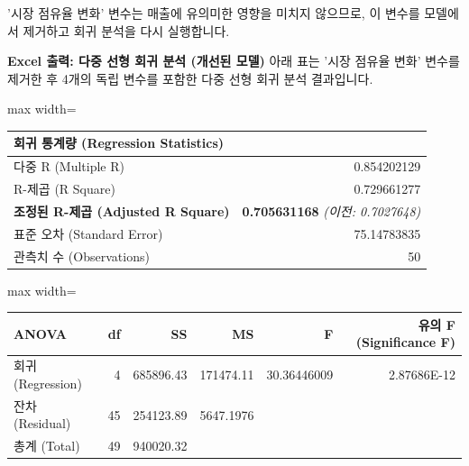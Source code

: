 \documentclass[11pt,a4paper]{article}
\begin{document}
\newpage
\begin{tcolorbox}[title=\textbf{모델 개선: 유의미하지 않은 변수 제거}]
'시장 점유율 변화' 변수는 매출에 유의미한 영향을 미치지 않으므로, 이 변수를 모델에서 제거하고 회귀 분석을 다시 실행합니다.

\textbf{Excel 출력: 다중 선형 회귀 분석 (개선된 모델)}
아래 표는 '시장 점유율 변화' 변수를 제거한 후 4개의 독립 변수를 포함한 다중 선형 회귀 분석 결과입니다.

\begin{adjustbox}{max width=\textwidth}
\begin{tabular}{l r}
\toprule
\textbf{회귀 통계량 (Regression Statistics)} & \\
\midrule
다중 R (Multiple R) & 0.854202129 \\
R-제곱 (R Square) & 0.729661277 \\
\textbf{조정된 R-제곱 (Adjusted R Square)} & \textbf{0.705631168} \quad \textit{(이전: 0.7027648)} \\
표준 오차 (Standard Error) & 75.14783835 \\
관측치 수 (Observations) & 50 \\
\bottomrule
\end{tabular}
\end{adjustbox}

\vspace{0.5em}

\begin{adjustbox}{max width=\textwidth}
\begin{tabular}{l r r r r r}
\toprule
\textbf{ANOVA} & \textbf{df} & \textbf{SS} & \textbf{MS} & \textbf{F} & \textbf{유의 F (Significance F)} \\
\midrule
회귀 (Regression) & 4 & 685896.43 & 171474.11 & 30.36446009 & 2.87686E-12 \\
잔차 (Residual) & 45 & 254123.89 & 5647.1976 & & \\
총계 (Total) & 49 & 940020.32 & & & \\
\bottomrule
\end{tabular}
\end{adjustbox}

\vspace{0.5em}


\end{tcolorbox}
\end{document}
